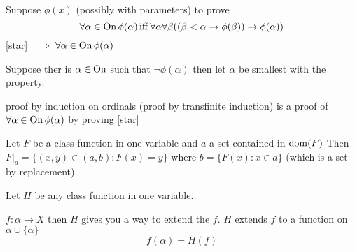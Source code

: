 Suppose $\phi(x)$ (possibly with parameters)
to prove 
\begin{equation}\label{star}
    \forall \alpha\in \operatorname{On}  \phi(\alpha) \operatorname{iff} \forall \alpha \forall \beta ((\beta<\alpha\to \phi(\beta))\to \phi(\alpha))
\end{equation}
\ref{star} $\implies \forall \alpha\in \operatorname{On}  \phi(\alpha)$

Suppose ther is $\alpha\in \operatorname{On} $ such that $\lnot \phi(\alpha)$ then let $\alpha$ be smallest with the property.

proof by induction on ordinals (proof by transfinite induction) is a proof of $\forall \alpha\in \operatorname{On}  \phi(\alpha)$ by proving \ref{star}

Let $F$ be a class function in one variable and $a$ a set contained in $\operatorname{dom} (F)$ 
Then $F|_{a} = \{(x,y)\in (a,b) : F(x) = y\}$ where $b = \{F(x) : x\in a\}$ (which is a set by replacement).

Let $H$ be any class function in one variable.


$f:\alpha\to X$ then $H$ gives you a way to extend the $f$.
$H$ extends $f$ to a function on $\alpha\cup\{\alpha\}$
$$f(\alpha) = H(f)$$

